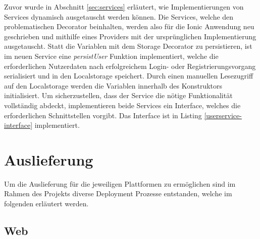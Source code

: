 Zuvor wurde in Abschnitt \ref{sec:services} erläutert, wie
Implementierungen von Services dynamisch ausgetauscht werden können.
Die Services, welche den problematischen Decorator beinhalten, werden also für die Ionic Anwendung neu geschrieben
und mithilfe eines Providers mit der ursprünglichen Implementierung ausgetauscht.
Statt die Variablen mit dem Storage Decorator zu persistieren, ist im neuen Service eine \emph{persistUser} Funktion implementiert, welche die erforderlichen Nutzerdaten nach
erfolgreichem Login- oder Registrierungsvorgang serialisiert und in den Localstorage speichert.
Durch einen manuellen Lesezugriff auf den Localstorage werden die Variablen innerhalb des Konstruktors initialisiert.
Um sicherzustellen, dass der Service die nötige Funktionalität vollständig abdeckt, implementieren beide Services ein Interface,
welches die erforderlichen Schnittstellen vorgibt. Das Interface ist in Listing \ref{userservice-interface} implementiert.

\vspace{0.3cm}





\newpage
\section{Auslieferung}

Um die Auslieferung für die jeweiligen Plattformen zu ermöglichen
sind im Rahmen des Projekts \projectname{} diverse Deployment Prozesse entstanden,
welche im folgenden erläutert werden.

\subsection{Web}
\label{deployment-web}

